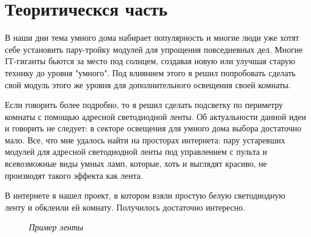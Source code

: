 \documentclass[a4paper, 12pt]{article}
\newcommand{\image}[3]{\begin{figure}[ht]\center{\texttt{[image: ../img/\#1]} }\caption{\textit{#3}}\end{figure}}
\begin{document}
\setcounter{section}{2} %
\section{Теоритическся часть}

В наши дни тема умного дома набирает популярность и многие люди уже хотят себе
установить пару-тройку модулей для упрощения повседневных дел. Многие 
IT-гиганты бьются за место под солнцем, создавая новую или улучшая старую 
технику до уровня "умного". Под влиянием этого я решил попробовать сделать 
свой модуль этого же уровня для дополнительного освещения своей комнаты.

Если говорить более подробно, то я решил сделать подсветку по периметру комнаты 
с помощью адресной светодиодной ленты. Об актуальности данной идеи и говорить 
не следует: в секторе освещения для умного дома выбора достаточно мало. Все, 
что мне удалось найти на просторах интернета: пару устаревших модулей для 
адресной светодиодной ленты под управлением с пульта и всевозможные виды умных
ламп, которые, хоть и выглядят красиво, не производят такого эффекта как 
лента. 

В интернете я нашел проект, в котором взяли простую белую светодиодную ленту 
и обклеили ей комнату. Получилось достаточно интересно. 

\image{белая_лента.jpg}{200}{Пример ленты}
\end{document}
